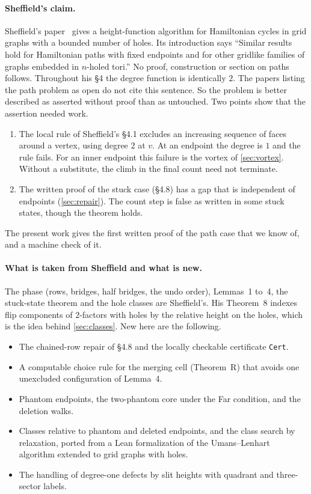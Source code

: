 \documentclass[11pt]{article}
\theoremstyle{plain}
\theoremstyle{definition}
\theoremstyle{remark}
\newcommand{\lean}[1]{\texttt{#1}}
\begin{document}
\paragraph{Sheffield's claim.}
Sheffield's paper~\cite{sheffield2000} gives a height-function algorithm for Hamiltonian cycles in
grid graphs with a bounded number of holes.
Its introduction says ``Similar results hold for Hamiltonian paths with fixed endpoints and for
other gridlike families of graphs embedded in $n$-holed tori.''
No proof, construction or section on paths follows.
Throughout his \S4 the degree function is identically $2$.
The papers listing the path problem as open do not cite this sentence.
So the problem is better described as asserted without proof than as untouched.
Two points show that the assertion needed work.
\begin{enumerate}
\item The local rule of Sheffield's \S4.1 excludes an increasing sequence of faces around a vertex,
  using degree $2$ at $v$.
  At an endpoint the degree is $1$ and the rule fails.
  For an inner endpoint this failure is the vortex of \cref{sec:vortex}.
  Without a substitute, the climb in the final count need not terminate.
\item The written proof of the stuck case (\S4.8) has a gap that is independent of endpoints
  (\cref{sec:repair}).
  The count step is false as written in some stuck states, though the theorem holds.
\end{enumerate}
The present work gives the first written proof of the path case that we know of, and a machine
check of it.

\paragraph{What is taken from Sheffield and what is new.}
The phase (rows, bridges, half bridges, the undo order), Lemmas~1 to~4, the stuck-state theorem and
the hole classes are Sheffield's.
His Theorem~8 indexes flip components of $2$-factors with holes by the relative height on the holes,
which is the idea behind \cref{sec:classes}.
New here are the following.
\begin{itemize}
\item The chained-row repair of \S4.8 and the locally checkable certificate \lean{Cert}.
\item A computable choice rule for the merging cell (Theorem~R) that avoids one unexcluded
  configuration of Lemma~4.
\item Phantom endpoints, the two-phantom core under the Far condition, and the deletion walks.
\item Classes relative to phantom and deleted endpoints, and the class search by relaxation, ported
  from a Lean formalization of the Umans--Lenhart algorithm extended to grid graphs with holes.
\item The handling of degree-one defects by slit heights with quadrant and three-sector labels.
\end{itemize}
\end{document}
